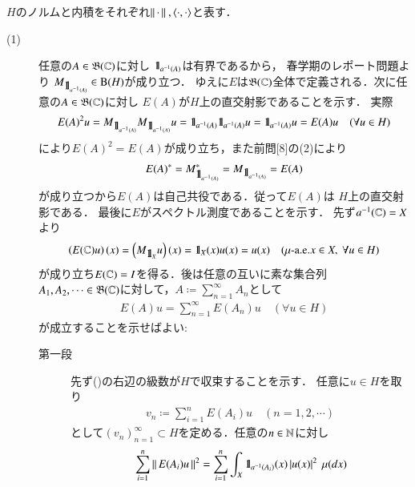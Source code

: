 	\begin{prf} $H$のノルムと内積をそれぞれ$\Norm{\cdot}{},\inprod<\cdot,\cdot>$と表す．
		\begin{description}
			\item[(1)] 
				任意の$A \in \mathfrak{B}(\mathbb{C})$に対し
				$\mbox{1}\hspace{-0.25em}\mbox{l}_{a^{-1}(A)}$は有界であるから，
				春学期のレポート問題より
				$M_{\mbox{1}\hspace{-0.25em}\mbox{l}_{a^{-1}(A)}} \in \mathrm{B}(H) $が成り立つ．
				ゆえに$E$は$\mathfrak{B}(\mathbb{C})$全体で定義される．次に任意の$A \in \mathfrak{B}(\mathbb{C})$に対し
				$E(A)$が$H$上の直交射影であることを示す．
				実際
				\begin{align}
					E(A)^2 u = M_{\mbox{1}\hspace{-0.25em}\mbox{l}_{a^{-1}(A)}}M_{\mbox{1}\hspace{-0.25em}\mbox{l}_{a^{-1}(A)}}u
					= \mbox{1}\hspace{-0.25em}\mbox{l}_{a^{-1}(A)}\mbox{1}\hspace{-0.25em}\mbox{l}_{a^{-1}(A)}u
					= \mbox{1}\hspace{-0.25em}\mbox{l}_{a^{-1}(A)}u
					= E(A) u
					\quad (\forall u \in H)
				\end{align}
				により$E(A)^2 = E(A)$が成り立ち，また前問[8]の(2)により
				\begin{align}
					E(A)^* = M_{\mbox{1}\hspace{-0.25em}\mbox{l}_{a^{-1}(A)}}^* = M_{\mbox{1}\hspace{-0.25em}\mbox{l}_{a^{-1}(A)}} = E(A)
				\end{align}
				が成り立つから$E(A)$は自己共役である．従って$E(A)$は
				$H$上の直交射影である．
				最後に$E$がスペクトル測度であることを示す．
				先ず$a^{-1}(\mathbb{C}) = X$より
				\begin{align}
					\left( E(\mathbb{C})u \right)(x) = \left( M_{\mbox{1}\hspace{-0.25em}\mbox{l}_X}u \right)(x) 
					= \mbox{1}\hspace{-0.25em}\mbox{l}_X(x) u(x) = u(x)
					\quad (\mbox{$\mu$-a.e.}x \in X,\ \forall u \in H)
				\end{align}
				が成り立ち$E(\mathbb{C}) = I$を得る．後は任意の互いに素な集合列
				$A_1,A_2,\cdots \in \mathfrak{B}(\mathbb{C})$に対して，$A \coloneqq \sum_{n=1}^{\infty}A_n$として
				\begin{align}
					E(A) u = \sum_{n=1}^{\infty} E(A_n) u \quad (\forall u \in H)
					\label{eq:report_9_1}
				\end{align}
				が成立することを示せばよい:
				\begin{description}
					\item[第一段]
						先ず()の右辺の級数が$H$で収束することを示す．
						任意に$u \in H$を取り
						\begin{align}
							v_n \coloneqq \sum_{i=1}^{n} E(A_i) u
							\quad (n=1,2,\cdots)
						\end{align}
						として$(v_n)_{n=1}^{\infty} \subset H$を定める．任意の$n \in \mathbb{N}$に対し
						\begin{align}
							&\sum_{i=1}^{n} \Norm{E(A_i) u}{}^2
							= \sum_{i=1}^{n} \int_X \defunc_{a^{-1}(A_i)}(x) \left| u(x) \right|^2\ \mu(dx) \\

\end{align}
\end{description}
\end{description}
\end{prf}
